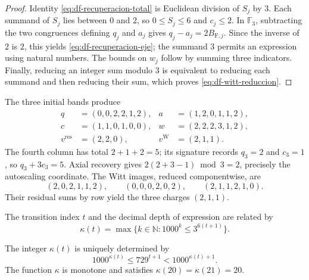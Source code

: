 \begin{proof}
Identity \eqref{eq:df-recuperacion-total} is Euclidean division of
\(S_j\) by \(3\). Each summand of \(S_j\) lies between \(0\) and
\(2\), so \(0\leq S_j\leq6\) and \(c_j\leq2\). In \(\mathbb F_3\),
subtracting the two congruences defining \(q_j\) and \(a_j\) gives
\(q_j-a_j=2B_{\mathrm F,j}\). Since the inverse of \(2\) is \(2\),
this yields \eqref{eq:df-recuperacion-eje}; the summand \(3\) permits
an expression using natural numbers. The bounds on \(w_j\) follow by
summing three indicators. Finally, reducing an integer sum modulo \(3\)
is equivalent to reducing each summand and then reducing their sum,
which proves \eqref{eq:df-witt-reduccion}.
\end{proof}

\begin{example}
The three initial bands produce
\begin{align*}
 q&=(0,0,2,2,1,2),&a&=(1,2,0,1,1,2),\\
 c&=(1,1,0,1,0,0),&w&=(2,2,2,3,1,2),\\
 v^{\mathrm{res}}&=(2,2,0),&v^{\mathrm W}&=(2,1,1).
\end{align*}
The fourth column has total \(2+1+2=5\); its signature records
\(q_3=2\) and \(c_3=1\), so \(q_3+3c_3=5\).
Axial recovery gives
\(2(2+3-1)\bmod3=2\), precisely the autoscaling coordinate.
The Witt images, reduced componentwise, are
\[
 (2,0,2,1,1,2),\qquad
 (0,0,0,2,0,2),\qquad
 (2,1,1,2,1,0).
\]
Their residual sums by row yield the three charges \((2,1,1)\).
\end{example}

\begin{definition}
The transition index \(t\) and the decimal depth of expression are related by
\begin{equation}
 \kappa(t)=\max\{k\in\mathbb N:1000^k\leq3^{6(t+1)}\}.
 \label{eq:df-reloj}
\end{equation}
\end{definition}

\begin{proposition}
\label{prop:df-reloj}
The integer \(\kappa(t)\) is uniquely determined by
\begin{equation}
 1000^{\kappa(t)}\leq729^{t+1}<1000^{\kappa(t)+1}.
 \label{eq:df-reloj-cotas}
\end{equation}
The function \(\kappa\) is monotone and satisfies
\(\kappa(20)=\kappa(21)=20\).
\end{proposition}

